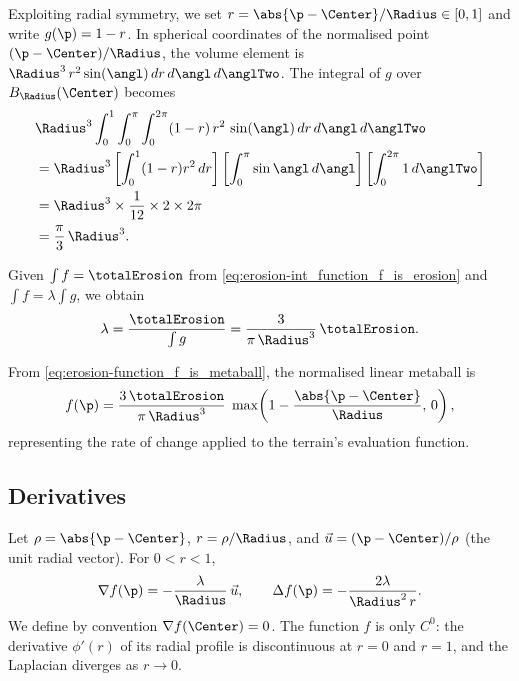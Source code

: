 Exploiting radial symmetry, we set $r = \abs{\p - \Center} / \Radius \in [0,1]$ and write $g(\p) = 1 - r$.  
In spherical coordinates of the normalised point $(\p - \Center)/\Radius$, the volume element is $\Radius^3\, r^2 \sin(\angl)\, dr\, d\angl\, d\anglTwo$.  
The integral of $g$ over $B_{\Radius}(\Center)$ becomes
\begin{align}
    &\Radius^3 \int_{0}^{1} \int_{0}^{\pi} \int_{0}^{2\pi} (1 - r) \, r^2 \, \sin(\angl)\, dr\, d\angl\, d\anglTwo \nonumber \\
    &= \Radius^3 \left[ \int_{0}^{1} (1 - r) r^2 \, dr \right]
       \left[ \int_{0}^{\pi} \sin{\angl} \, d\angl \right]
       \left[ \int_{0}^{2\pi} 1 \, d\anglTwo \right] \nonumber \\
    &= \Radius^3 \times \frac{1}{12} \times 2 \times 2\pi \nonumber \\
    &= \frac{\pi}{3} \, \Radius^3.
\end{align}

Given $\int f = \totalErosion$ from \cref{eq:erosion-int_function_f_is_erosion} and $\int f = \lambda \int g$, we obtain
\begin{equation}
    \lambda = \frac{\totalErosion}{\int g} = \frac{3}{\pi\,\Radius^3}\,\totalErosion.
\end{equation}

From \eqref{eq:erosion-function_f_is_metaball}, the normalised linear metaball is
\begin{equation} 
    \label{eq:erosion-proofErosionMetaball}
    f(\p) = \frac{3 \,\totalErosion}{\pi\,\Radius^3} \;
    \max\!\left(1 - \frac{\abs{\p - \Center}}{\Radius},\,0\right),
\end{equation}
representing the rate of change applied to the terrain's evaluation function.

\subsection*{Derivatives}
Let $\rho = \abs{\p - \Center}$, $r=\rho/\Radius$, and $\vec{u} = (\p - \Center)/\rho$ (the unit radial vector).  
For $0 < r < 1$,
\begin{equation}
    \nabla f(\p) = -\frac{\lambda}{\Radius} \, \vec{u},
    \qquad
    \Delta f(\p) = -\frac{2\lambda}{\Radius^2\, r}.
\end{equation}
We define by convention $\nabla f(\Center) = 0$.  
The function $f$ is only $C^0$: the derivative $\phi'(r)$ of its radial profile is discontinuous at $r=0$ and $r=1$, and the Laplacian diverges as $r \to 0$.

